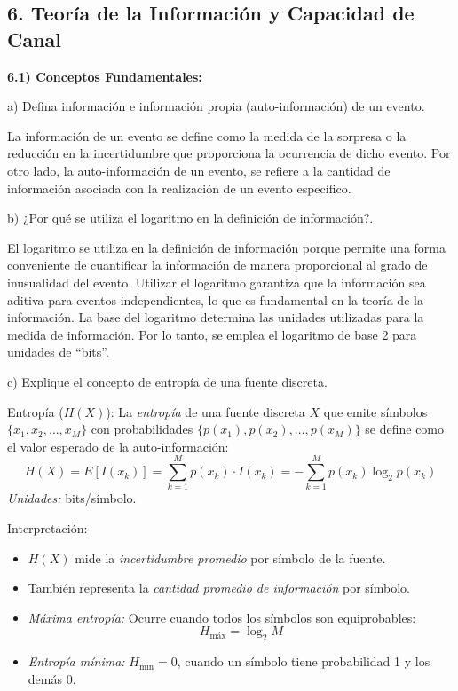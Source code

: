 \subsection*{6. Teoría de la Información y Capacidad de Canal}

\noindent \textbf{6.1) Conceptos Fundamentales:}\par
\bigskip

\noindent a) Defina información e información propia (auto-información) de un evento.\par
\bigskip

La información de un evento se define como la medida de la sorpresa o la reducción en la incertidumbre que proporciona la ocurrencia de dicho evento. Por otro lado, la auto-información de un evento, se refiere a la cantidad de información asociada con la realización de un evento específico.
\bigskip

\noindent b) ¿Por qué se utiliza el logaritmo en la definición de información?.\par
\bigskip
El logaritmo se utiliza en la definición de información porque permite una forma conveniente de cuantificar la información de manera proporcional al grado de inusualidad del evento. Utilizar el logaritmo garantiza que la información sea aditiva para eventos independientes, lo que es fundamental en la teoría de la información. La base del logaritmo determina las unidades utilizadas para la medida de información. Por lo
tanto, se emplea el logaritmo de base 2 para unidades de “bits”.
\bigskip

\noindent c) Explique el concepto de entropía de una fuente discreta. \par
\bigskip

\noindent Entropía (\( H(X) \)): La \textit{entropía} de una fuente discreta \( X \) que emite símbolos \( \{x_1, x_2, \dots, x_M\} \) con probabilidades \( \{p(x_1), p(x_2), \dots, p(x_M)\} \) se define como el valor esperado de la auto-información:
\[
H(X) = E[I(x_k)] = \sum_{k=1}^{M} p(x_k) \cdot I(x_k) = -\sum_{k=1}^{M} p(x_k) \log_2 p(x_k)
\]
\textit{Unidades:} bits/símbolo.   \par 
\noindent Interpretación:
\begin{itemize}
    \item \( H(X) \) mide la \textit{incertidumbre promedio} por símbolo de la fuente.
    \item También representa la \textit{cantidad promedio de información} por símbolo.
    \item \textit{Máxima entropía:} Ocurre cuando todos los símbolos son equiprobables:
        \[
        H_{\text{máx}} = \log_2 M
        \]
    \item \textit{Entropía mínima:} \( H_{\text{min}} = 0 \), cuando un símbolo tiene probabilidad 1 y los demás 0.
\end{itemize}
\bigskip

